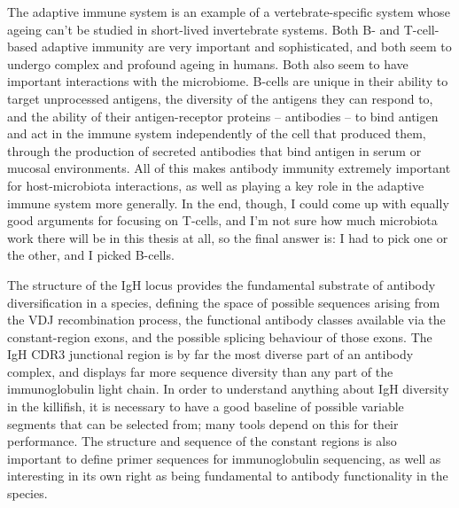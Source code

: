 The adaptive immune system is an example of a vertebrate-specific system whose ageing can't be studied in short-lived invertebrate systems. Both B- and T-cell-based adaptive immunity are very important and sophisticated, and both seem to undergo complex and profound ageing in humans. Both also seem to have important interactions with the microbiome. B-cells are unique in their ability to target unprocessed antigens, the diversity of the antigens they can respond to, and the ability of their antigen-receptor proteins -- antibodies -- to bind antigen and act in the immune system independently of the cell that produced them, through the production of secreted antibodies that bind antigen in serum or mucosal environments. All of this makes antibody immunity extremely important for host-microbiota interactions, as well as playing a key role in the adaptive immune system more generally. In the end, though, I could come up with equally good arguments for focusing on T-cells, and I'm not sure how much microbiota work there will be in this thesis at all, so the final answer is: I had to pick one or the other, and I picked B-cells.


The structure of the IgH locus provides the fundamental substrate of antibody diversification in a species, defining the space of possible sequences arising from the VDJ recombination process, the functional antibody classes available via the constant-region exons, and the possible splicing behaviour of those exons. The IgH CDR3 junctional region is by far the most diverse part of an antibody complex, and displays far more sequence diversity than any part of the immunoglobulin light chain. In order to understand anything about IgH diversity in the killifish, it is necessary to have a good baseline of possible variable segments that can be selected from; many tools depend on this for their performance. The structure and sequence of the constant regions is also important to define primer sequences for immunoglobulin sequencing, as well as interesting in its own right as being fundamental to antibody functionality in the species.

